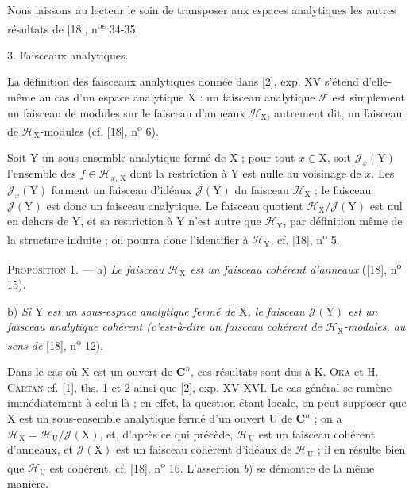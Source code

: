 Nous laissons au lecteur le soin de transposer aux espaces analytiques les autres résultats de [18], n\textsuperscript{os} 34-35.


3. Faisceaux analytiques.

La définition des faisceaux analytiques donnée dans [2], exp. XV s'étend d'elle-même au cas d'un espace analytique $\mathrm{X}$ : un faisceau analytique $\mathcal{F}$ est simplement un faisceau de modules sur le faisceau d'anneaux $\mathcal{H}_{\mathrm{X}}$, autrement dit, un faisceau de $\mathcal{H}_{\mathrm{X}}$-modules (cf. [18], n\textsuperscript{o} 6).

Soit $\mathrm{Y}$ un sous-ensemble analytique fermé de $\mathrm{X}$ ; pour tout $x \in \mathrm{X}$, soit $\mathcal{J}_x(\mathrm{Y})$ l'ensemble des $f \in \mathcal{H}_{x,\,\mathrm{X}}$ dont la restriction à $\mathrm{Y}$ est nulle au voisinage de $x$. Les $\mathcal{J}_x(\mathrm{Y})$ forment un faisceau d'idéaux $\mathcal{J}(\mathrm{Y})$ du faisceau $\mathcal{H}_{\mathrm{X}}$ ; le faisceau $\mathcal{J}(\mathrm{Y})$ est donc un faisceau analytique. Le faisceau quotient $\mathcal{H}_{\mathrm{X}}/\mathcal{J}(\mathrm{Y})$ est nul en dehors de $\mathrm{Y}$, et sa restriction à $\mathrm{Y}$ n'est autre que $\mathcal{H}_{\mathrm{Y}}$, par définition même de la structure induite ; on pourra donc l'identifier à $\mathcal{H}_{\mathrm{Y}}$, cf. [18], n\textsuperscript{o} 5.

\textsc{Proposition} 1. --- a) \textit{Le faisceau $\mathcal{H}_{\mathrm{X}}$ est un faisceau cohérent d'anneaux} ([18], n\textsuperscript{o} 15).

b) \textit{Si $\mathrm{Y}$ est un sous-espace analytique fermé de $\mathrm{X}$, le faisceau $\mathcal{J}(\mathrm{Y})$ est un faisceau analytique cohérent (c'est-à-dire un faisceau cohérent de $\mathcal{H}_{\mathrm{X}}$-modules, au sens de} [18], n\textsuperscript{o} 12).



Dans le cas où $\mathrm{X}$ est un ouvert de $\mathbf{C}^n$, ces résultats sont dus à K. \textsc{Oka} et H. \textsc{Cartan} cf. [1], ths. 1 et 2 ainsi que [2], exp. XV-XVI. Le cas général se ramène immédiatement à celui-là ; en effet, la question étant locale, on peut supposer que $\mathrm{X}$ est un sous-ensemble analytique fermé d'un ouvert $\mathrm{U}$ de $\mathbf{C}^n$ ; on a $\mathcal{H}_{\mathrm{X}} = \mathcal{H}_{\mathrm{U}}/\mathcal{J}(\mathrm{X})$, et, d'après ce qui précède, $\mathcal{H}_{\mathrm{U}}$ est un faisceau cohérent d'anneaux, et $\mathcal{J}(\mathrm{X})$ est un faisceau cohérent d'idéaux de $\mathcal{H}_{\mathrm{U}}$ ; il en résulte bien que $\mathcal{H}_{\mathrm{U}}$ est cohérent, cf. [18], n\textsuperscript{o} 16. L'assertion \textit{b}) se démontre de la même manière.

